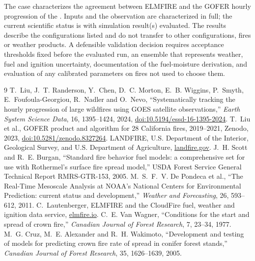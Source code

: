 The case characterizes the agreement between ELMFIRE and the GOFER hourly
progression of the \FireName{}.  Inputs and the observation are characterized
in full; the current scientific status is \textbf{} with
 simulation result(s) evaluated.  The results
describe the configurations listed and do not transfer to other
configurations, fires or weather products.  A defensible validation decision
requires acceptance thresholds fixed before the evaluated run, an ensemble that
represents weather, fuel and ignition uncertainty, documentation of the
fuel-moisture derivation, and evaluation of any calibrated parameters on fires
not used to choose them.

\begin{thebibliography}{9}
 T.~Liu, J.~T. Randerson, Y.~Chen, D.~C. Morton, E.~B. Wiggins, P.~Smyth, E.~Foufoula-Georgiou, R.~Nadler and O.~Nevo, ``Systematically tracking the hourly progression of large wildfires using GOES satellite observations,'' \emph{Earth System Science Data}, 16, 1395--1424, 2024, \href{https://doi.org/10.5194/essd-16-1395-2024}{doi:10.5194/essd-16-1395-2024}.
 T.~Liu et al., GOFER product and algorithm for 28 California fires, 2019--2021, Zenodo, 2023, \href{https://doi.org/10.5281/zenodo.8327264}{doi:10.5281/zenodo.8327264}.
 LANDFIRE, U.S. Department of the Interior, Geological Survey, and U.S. Department of Agriculture, \href{https://landfire.gov}{landfire.gov}.
 J.~H. Scott and R.~E. Burgan, ``Standard fire behavior fuel models: a comprehensive set for use with Rothermel's surface fire spread model,'' USDA Forest Service General Technical Report RMRS-GTR-153, 2005.
 M.~S.~F.~V. De Pondeca et al., ``The Real-Time Mesoscale Analysis at NOAA's National Centers for Environmental Prediction: current status and development,'' \emph{Weather and Forecasting}, 26, 593--612, 2011.
 C.~Lautenberger, ELMFIRE and the CloudFire fuel, weather and ignition data service, \href{https://elmfire.io}{elmfire.io}.
 C.~E. Van Wagner, ``Conditions for the start and spread of crown fire,'' \emph{Canadian Journal of Forest Research}, 7, 23--34, 1977.
 M.~G. Cruz, M.~E. Alexander and R.~H. Wakimoto, ``Development and testing of models for predicting crown fire rate of spread in conifer forest stands,'' \emph{Canadian Journal of Forest Research}, 35, 1626--1639, 2005.
\end{thebibliography}
